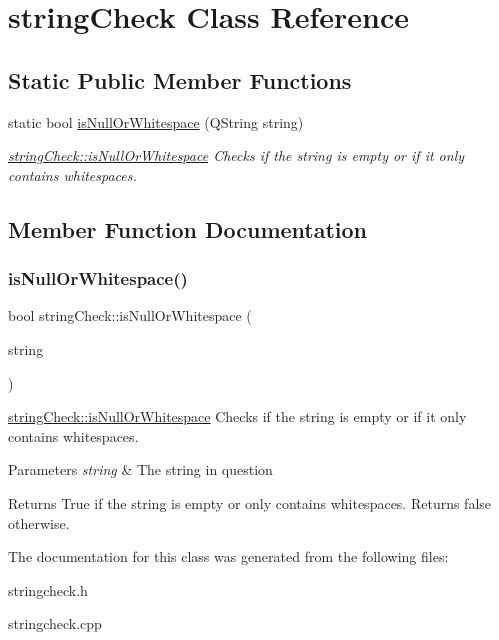 \hypertarget{classstring_check}{}\section{string\+Check Class Reference}
\label{classstring_check}
\subsection*{Static Public Member Functions}
\begin{DoxyCompactItemize}
\item 
static bool \hyperlink{classstring_check_a25a6eebd6a36799e3a2c8335288929d2}{is\+Null\+Or\+Whitespace} (Q\+String string)
\begin{DoxyCompactList}\small\item\em \hyperlink{classstring_check_a25a6eebd6a36799e3a2c8335288929d2}{string\+Check\+::is\+Null\+Or\+Whitespace} Checks if the string is empty or if it only contains whitespaces. \end{DoxyCompactList}\end{DoxyCompactItemize}


\subsection{Member Function Documentation}
\mbox{\label{classstring_check_a25a6eebd6a36799e3a2c8335288929d2}} 
\subsubsection{\texorpdfstring{is\+Null\+Or\+Whitespace()}{isNullOrWhitespace()}}
{\footnotesize\ttfamily bool string\+Check\+::is\+Null\+Or\+Whitespace (\begin{DoxyParamCaption}\item[{Q\+String}]{string }\end{DoxyParamCaption})\hspace{0.3cm}{\ttfamily [static]}}



\hyperlink{classstring_check_a25a6eebd6a36799e3a2c8335288929d2}{string\+Check\+::is\+Null\+Or\+Whitespace} Checks if the string is empty or if it only contains whitespaces. 


\begin{DoxyParams}{Parameters}
{\em string} & The string in question \\
\hline
\end{DoxyParams}
\begin{DoxyReturn}{Returns}
True if the string is empty or only contains whitespaces. Returns false otherwise. 
\end{DoxyReturn}


The documentation for this class was generated from the following files\+:\begin{DoxyCompactItemize}
\item 
stringcheck.\+h\item 
stringcheck.\+cpp\end{DoxyCompactItemize}
